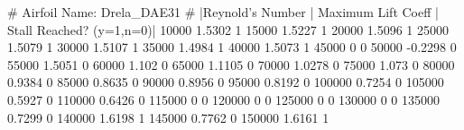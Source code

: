 # Airfoil Name: Drela_DAE31
# |Reynold's Number | Maximum Lift Coeff | Stall Reached? (y=1,n=0)|
10000 1.5302 1
15000 1.5227 1
20000 1.5096 1
25000 1.5079 1
30000 1.5107 1
35000 1.4984 1
40000 1.5073 1
45000 0   0
50000 -0.2298 0
55000 1.5051 0
60000 1.102 0
65000 1.1105 0
70000 1.0278 0
75000 1.073 0
80000 0.9384 0
85000 0.8635 0
90000 0.8956 0
95000 0.8192 0
100000 0.7254 0
105000 0.5927 0
110000 0.6426 0
115000 0 0
120000 0   0
125000 0   0
130000 0   0
135000 0.7299 0
140000 1.6198 1
145000 0.7762 0
150000 1.6161 1
